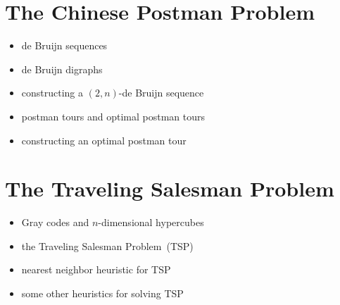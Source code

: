 
\section{The Chinese Postman Problem}

\begin{itemize}
\item de Bruijn sequences

\item de Bruijn digraphs

\item constructing a $(2, n)$-de Bruijn sequence

\item postman tours and optimal postman tours

\item constructing an optimal postman tour
\end{itemize}



\section{The Traveling Salesman Problem}

\begin{itemize}
\item Gray codes and $n$-dimensional hypercubes

\item the Traveling Salesman Problem~(TSP)

\item nearest neighbor heuristic for TSP

\item some other heuristics for solving TSP
\end{itemize}
